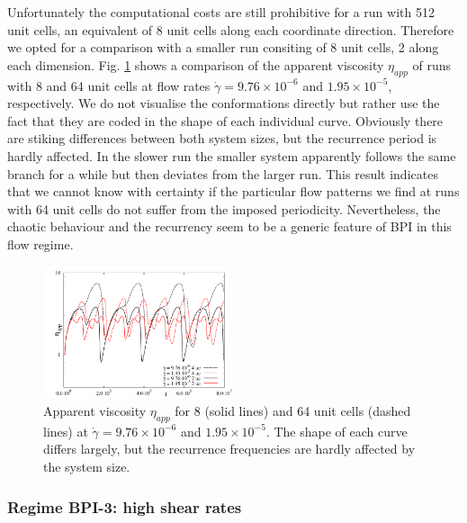 \documentclass[aps,pre,reprint,superscriptaddress, twocolumn]{revtex4}
\newcommand{\e}[1]{\times10^{#1}}
\newcommand{\gd}{\dot{\gamma}}
\begin{document}
Unfortunately the computational costs are still prohibitive for a run 
with 512 unit cells, an equivalent of 8 unit cells along each coordinate 
direction. Therefore we opted for a comparison with a smaller run consiting
of 8 unit cells, 2 along each dimension.
Fig. \ref{bp1-2uc4uc} shows a comparison of the apparent viscosity $\eta_{app}$ 
of runs with 8 and 64 unit cells at flow rates 
$\gd=9.76\e{-6}$ and $1.95\e{-5}$, respectively.
We do not visualise the conformations directly but rather use the fact that 
they are coded in the shape of each individual curve. Obviously there 
are stiking differences between 
both system sizes, but the recurrence period is hardly affected. In the slower
run the smaller system apparently follows the same branch for a while but then
deviates from the larger run. 
This result indicates that we cannot know with certainty if the particular flow patterns 
we find at runs with 64 unit cells do not suffer from the imposed periodicity.
Nevertheless, the chaotic behaviour and the recurrency seem to be a generic
feature of BPI in this flow regime.
 
\begin{figure}[htpb]
\includegraphics[width=0.495\textwidth]{stress_bp1_2uc_4uc.pdf}
\caption{Apparent viscosity $\eta_{app}$ for 8 (solid lines) and 64 unit cells (dashed lines)
at $\gd=9.76\e{-6}$ and $1.95\e{-5}$. The shape of each curve differs largely, but the recurrence frequencies are hardly affected by the system size.}
\label{bp1-2uc4uc}
\end{figure}

\subsubsection{Regime BPI-3: high shear rates}
\end{document}
